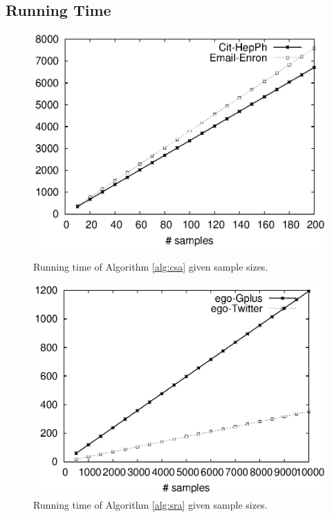 \documentclass{article}
\begin{document}
\subsection{Running Time}
\begin{figure}[!t]
\centering
\begin{minipage}{.45\textwidth}
\centering
\includegraphics[width=.9\textwidth]{cos_runtime.eps}
\caption{Running time of Algorithm \ref{alg:csa} given sample sizes.}
\label{fig:run_cos}
\end{minipage}
\hspace{1cm}
\begin{minipage}{.45\textwidth}
\centering
\includegraphics[width=.9\textwidth]{simrank_runtime.eps}
\caption{Running time of Algorithm \ref{alg:sra} given sample sizes.}
\label{fig:run_sr}
\end{minipage}
\end{figure}
\end{document}
